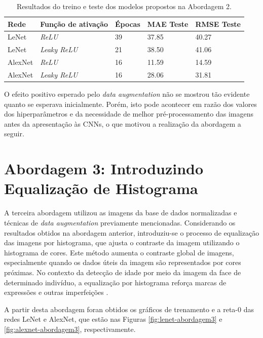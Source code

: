 	\begin{table}[!ht]
		\caption{Resultados do treino e teste dos modelos propostos na Abordagem 2.}
		\label{tab:results2}
		\begin{center}
			\begin{tabular}{l l l l l}
				\toprule
				Rede & Função de ativação & Épocas & MAE Teste & RMSE Teste \\
				\midrule
				LeNet & \emph{ReLU}  & 39 & 37.85 & 40.27 \\
				LeNet & \emph{Leaky ReLU} & 21 & 38.50 & 41.06 \\
				AlexNet & \emph{ReLU}  & 16 & 11.59 & 14.59 \\
				AlexNet & \emph{Leaky ReLU} & 16 & 28.06 & 31.81 \\
				\bottomrule
			\end{tabular}
		\end{center}
	\end{table}

	O efeito positivo esperado pelo \emph{data augmentation} não se mostrou tão evidente quanto se esperava inicialmente. Porém, isto pode acontecer em razão dos valores dos hiperparâmetros e da necessidade de melhor pré-processamento das imagens antes da apresentação às CNNs, o que motivou a realização da abordagem a seguir.

\section{Abordagem 3: Introduzindo Equalização de Histograma}%
	A terceira abordagem utilizou as imagens da base de dados normalizadas e técnicas de \emph{data augmentation} previamente mencionadas. Considerando os resultados obtidos na abordagem anterior, introduziu-se o processo de equalização das imagens por histograma, que ajusta o contraste da imagem utilizando o histograma de cores. Este método aumenta o contraste global de imagens, especialmente quando os dados úteis da imagem são representados por cores próximas. No contexto da detecção de idade por meio da imagem da face de determinado indivíduo, a equalização por histograma reforça marcas de expressões e outras imperfeições \cite{acharya2005image}. %

	A partir desta abordagem foran obtidos os gráficos de trenamento e a reta-0 das redes LeNet e AlexNet, que estão nas Figuras \ref{fig:lenet-abordagem3} e \ref{fig:alexnet-abordagem3}, respectivamente.

